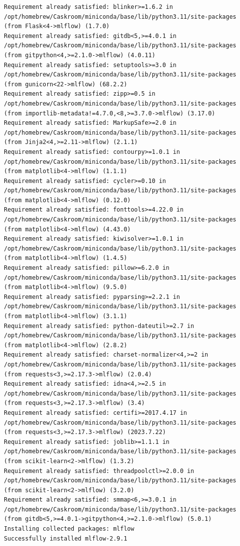 \documentclass[
  letterpaper,
  DIV=11,
  numbers=noendperiod]{scrartcl}
\begin{document}
\begin{verbatim}
Requirement already satisfied: blinker>=1.6.2 in /opt/homebrew/Caskroom/miniconda/base/lib/python3.11/site-packages (from Flask<4->mlflow) (1.7.0)
Requirement already satisfied: gitdb<5,>=4.0.1 in /opt/homebrew/Caskroom/miniconda/base/lib/python3.11/site-packages (from gitpython<4,>=2.1.0->mlflow) (4.0.11)
Requirement already satisfied: setuptools>=3.0 in /opt/homebrew/Caskroom/miniconda/base/lib/python3.11/site-packages (from gunicorn<22->mlflow) (68.2.2)
Requirement already satisfied: zipp>=0.5 in /opt/homebrew/Caskroom/miniconda/base/lib/python3.11/site-packages (from importlib-metadata!=4.7.0,<8,>=3.7.0->mlflow) (3.17.0)
Requirement already satisfied: MarkupSafe>=2.0 in /opt/homebrew/Caskroom/miniconda/base/lib/python3.11/site-packages (from Jinja2<4,>=2.11->mlflow) (2.1.1)
Requirement already satisfied: contourpy>=1.0.1 in /opt/homebrew/Caskroom/miniconda/base/lib/python3.11/site-packages (from matplotlib<4->mlflow) (1.1.1)
Requirement already satisfied: cycler>=0.10 in /opt/homebrew/Caskroom/miniconda/base/lib/python3.11/site-packages (from matplotlib<4->mlflow) (0.12.0)
Requirement already satisfied: fonttools>=4.22.0 in /opt/homebrew/Caskroom/miniconda/base/lib/python3.11/site-packages (from matplotlib<4->mlflow) (4.43.0)
Requirement already satisfied: kiwisolver>=1.0.1 in /opt/homebrew/Caskroom/miniconda/base/lib/python3.11/site-packages (from matplotlib<4->mlflow) (1.4.5)
Requirement already satisfied: pillow>=6.2.0 in /opt/homebrew/Caskroom/miniconda/base/lib/python3.11/site-packages (from matplotlib<4->mlflow) (9.5.0)
Requirement already satisfied: pyparsing>=2.2.1 in /opt/homebrew/Caskroom/miniconda/base/lib/python3.11/site-packages (from matplotlib<4->mlflow) (3.1.1)
Requirement already satisfied: python-dateutil>=2.7 in /opt/homebrew/Caskroom/miniconda/base/lib/python3.11/site-packages (from matplotlib<4->mlflow) (2.8.2)
Requirement already satisfied: charset-normalizer<4,>=2 in /opt/homebrew/Caskroom/miniconda/base/lib/python3.11/site-packages (from requests<3,>=2.17.3->mlflow) (2.0.4)
Requirement already satisfied: idna<4,>=2.5 in /opt/homebrew/Caskroom/miniconda/base/lib/python3.11/site-packages (from requests<3,>=2.17.3->mlflow) (3.4)
Requirement already satisfied: certifi>=2017.4.17 in /opt/homebrew/Caskroom/miniconda/base/lib/python3.11/site-packages (from requests<3,>=2.17.3->mlflow) (2023.7.22)
Requirement already satisfied: joblib>=1.1.1 in /opt/homebrew/Caskroom/miniconda/base/lib/python3.11/site-packages (from scikit-learn<2->mlflow) (1.3.2)
Requirement already satisfied: threadpoolctl>=2.0.0 in /opt/homebrew/Caskroom/miniconda/base/lib/python3.11/site-packages (from scikit-learn<2->mlflow) (3.2.0)
Requirement already satisfied: smmap<6,>=3.0.1 in /opt/homebrew/Caskroom/miniconda/base/lib/python3.11/site-packages (from gitdb<5,>=4.0.1->gitpython<4,>=2.1.0->mlflow) (5.0.1)
Installing collected packages: mlflow
Successfully installed mlflow-2.9.1
\end{verbatim}
\end{document}

